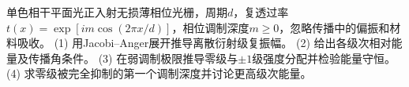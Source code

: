 单色相干平面光正入射无损薄相位光栅，周期\(d\)，复透过率\(t(x)=\exp[i m\cos(2\pi x/d)]\)，相位调制深度\(m\ge0\)，忽略传播中的偏振和材料吸收。
(1) 用Jacobi–Anger展开推导离散衍射级复振幅。
(2) 给出各级次相对能量及传播角条件。
(3) 在弱调制极限推导零级与\(\pm1\)级强度分配并检验能量守恒。
(4) 求零级被完全抑制的第一个调制深度并讨论更高级次能量。
